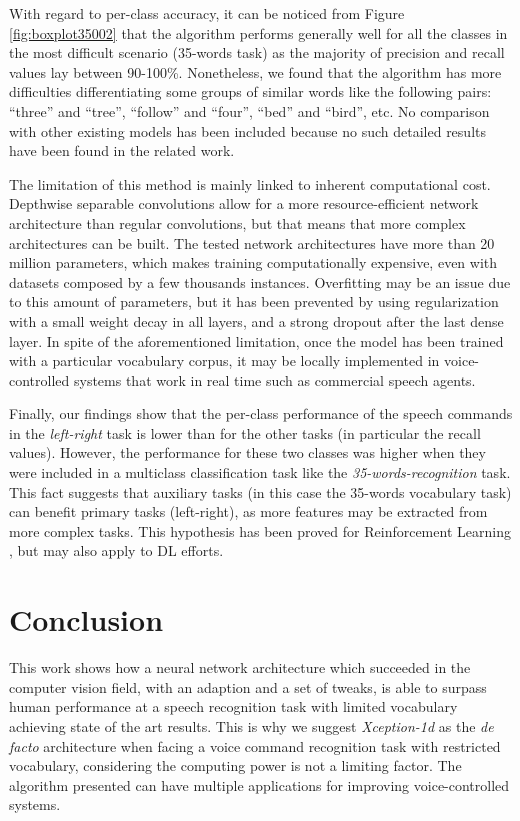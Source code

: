 \documentclass{elsarticle}
\begin{document}
With regard to per-class accuracy, it can be noticed from Figure \ref{fig:boxplot35002} that the algorithm performs generally well for all the classes in the most difficult scenario (35-words task) as the majority of precision and recall values lay between 90-100\%. Nonetheless, we found that the algorithm has more difficulties differentiating some groups of similar words like the following pairs: ``three'' and ``tree'', ``follow'' and ``four'', ``bed'' and ``bird'', etc. No comparison with other existing models has been included because no such detailed results have been found in the related work.

The limitation of this method is mainly linked to inherent computational cost. Depthwise separable convolutions allow for a more resource-efficient network architecture than regular convolutions, but that means that more complex architectures can be built. The tested network architectures have more than 20 million parameters, which makes training computationally expensive, even with datasets composed by a few thousands instances. Overfitting may be an issue due to this amount of parameters, but it has been prevented by using regularization with a small weight decay in all layers, and a strong dropout after the last dense layer. In spite of the aforementioned limitation, once the model has been trained with a particular vocabulary corpus, it may be locally implemented in voice-controlled systems that work in real time such as commercial speech agents.
  
Finally, our findings show that the per-class performance of the speech commands in the \textit{left-right} task is lower than for the other tasks (in particular the recall values). However, the performance for these two classes was higher when they were included in a multiclass classification task like the \textit{35-words-recognition} task. This fact suggests that auxiliary tasks (in this case the 35-words vocabulary task) can benefit primary tasks (left-right), as more features may be extracted from more complex tasks. This hypothesis has been proved for Reinforcement Learning \cite{Jaderberg2016}, but may also apply to DL efforts.


\section{Conclusion} \label{sec:conclusion}
This work shows how a neural network architecture which succeeded in the computer vision field, with an adaption and a set of tweaks, is able to surpass human performance at a speech recognition task with limited vocabulary achieving state of the art results. This is why we suggest \textit{Xception-1d} as the \textit{de facto} architecture when facing a voice command recognition task with restricted vocabulary,  considering the computing power is not a limiting factor. The algorithm presented can have multiple  applications for improving voice-controlled systems. 
\end{document}
